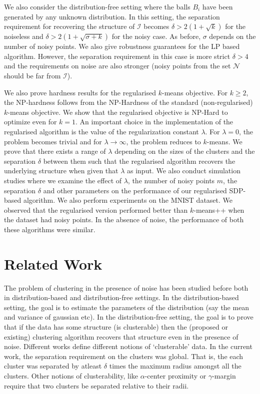 \documentclass[12pt]{article}
\newcommand{\mc}{\mathcal}
\begin{document}
We also consider the distribution-free setting where  the balls $B_i$ have been generated by any unknown distribution. In this setting, the separation requirement for recovering the structure of $\mc I$ becomes $\delta > 2(1 + \sqrt{k})$ for the noiseless and $\delta > 2(1+\sqrt{\sigma + k})$ for the noisy case. As before, $\sigma$ depends on the number of noisy points. We also give robustness guarantees for the LP based algorithm. However, the separation requirement in this case is more strict $\delta > 4$ and the requirements on noise are also stronger (noisy points from the set $\mc N$ should be far from $\mc I$).  

We also prove hardness results for the regularised $k$-means objective. For $k \ge 2$, the NP-hardness follows from the NP-Hardness of the standard (non-regularised) $k$-means objective. We show that the regularised objective is NP-Hard to optimize even for $k=1$. An important choice in the implementation of the regularised algorithm is the value of the regularization constant $\lambda$. For $\lambda = 0$, the problem becomes trivial and for $\lambda \rightarrow \infty$, the problem reduces to $k$-means. We prove that there exists a range of $\lambda$ depending on the sizes of the clusters and the separation $\delta$ between them such that the regularised algorithm recovers the underlying structure when given that $\lambda$ as input. We also conduct simulation studies where we examine the effect of $\lambda$, the number of noisy points $m$, the separation $\delta$ and other parameters on the performance of our regularised SDP-based algorithm. We also perform experiments on the MNIST dataset. We observed that the regularised version performed better than $k$-means++ when the dataset had noisy points. In the absence of noise, the performance of both these algorithms were similar. 

\section{Related Work}
The problem of clustering in the presence of noise has been studied before both in distribution-based and distribution-free settings. In the distribution-based setting, the goal is to estimate the parameters of the distribution (say the mean and variance of gaussian etc). In the distribution-free setting, the goal is to prove that if the data has some structure (is clusterable) then the (proposed or existing) clustering algorithm recovers that structure even in the presence of noise. Different works define different notions of `clusterable' data. In the current work, the separation requirement on the clusters was global. That is, the each cluster was separated by atleast $\delta$ times the maximum radius amongst all the clusters. Other notions of clusterability, like $\alpha$-center proximity \cite{awasthi2012center}or $\gamma$-margin \cite{ashtiani2016clustering} require that two clusters be separated relative to their radii.
\end{document}
